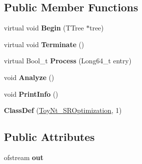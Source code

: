 \subsection*{Public Member Functions}
\begin{DoxyCompactItemize}
\item 
\hypertarget{classToyNt__SROptimization_adecb5beed52cb945815df2dc9c32d8ca}{
virtual void {\bfseries Begin} (TTree $\ast$tree)}
\label{classToyNt__SROptimization_adecb5beed52cb945815df2dc9c32d8ca}

\item 
\hypertarget{classToyNt__SROptimization_ad4cf1cfac6e5036a094b0bd1f926cc1b}{
virtual void {\bfseries Terminate} ()}
\label{classToyNt__SROptimization_ad4cf1cfac6e5036a094b0bd1f926cc1b}

\item 
\hypertarget{classToyNt__SROptimization_abbee1b8c437ee05569960f94c8d9579e}{
virtual Bool\_\-t {\bfseries Process} (Long64\_\-t entry)}
\label{classToyNt__SROptimization_abbee1b8c437ee05569960f94c8d9579e}

\item 
\hypertarget{classToyNt__SROptimization_a415f4471f18d5632962648a0f5f28fc5}{
void {\bfseries Analyze} ()}
\label{classToyNt__SROptimization_a415f4471f18d5632962648a0f5f28fc5}

\item 
\hypertarget{classToyNt__SROptimization_a1facd6744048c4519bd242e1d9440eb2}{
void {\bfseries PrintInfo} ()}
\label{classToyNt__SROptimization_a1facd6744048c4519bd242e1d9440eb2}

\item 
\hypertarget{classToyNt__SROptimization_a0c19731d8fc24a81fefc0be74c75ce34}{
{\bfseries ClassDef} (\hyperlink{classToyNt__SROptimization}{ToyNt\_\-SROptimization}, 1)}
\label{classToyNt__SROptimization_a0c19731d8fc24a81fefc0be74c75ce34}

\end{DoxyCompactItemize}
\subsection*{Public Attributes}
\begin{DoxyCompactItemize}
\item 
\hypertarget{classToyNt__SROptimization_a51de9284d40de871db2a658d0ddf8e3e}{
ofstream {\bfseries out}}
\label{classToyNt__SROptimization_a51de9284d40de871db2a658d0ddf8e3e}

\end{DoxyCompactItemize}
